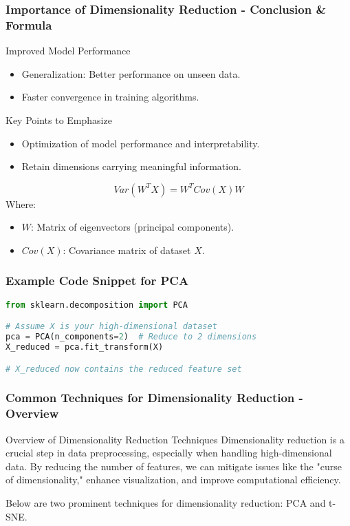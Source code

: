\documentclass[aspectratio=169]{beamer}
\begin{document}
\begin{frame}[fragile]
    \frametitle{Importance of Dimensionality Reduction - Conclusion & Formula}
    \begin{block}{Improved Model Performance}
        \begin{itemize}
            \item Generalization: Better performance on unseen data.
            \item Faster convergence in training algorithms.
        \end{itemize}
    \end{block}

    \begin{block}{Key Points to Emphasize}
        \begin{itemize}
            \item Optimization of model performance and interpretability.
            \item Retain dimensions carrying meaningful information.
        \end{itemize}
    \end{block}

    \begin{equation}
        Var(W^TX) = W^T Cov(X) W
    \end{equation}
    Where:
    \begin{itemize}
        \item \(W\): Matrix of eigenvectors (principal components).
        \item \(Cov(X)\): Covariance matrix of dataset \(X\).
    \end{itemize} 
\end{frame}

\begin{frame}[fragile]
    \frametitle{Example Code Snippet for PCA}
    \begin{lstlisting}[language=Python]
from sklearn.decomposition import PCA

# Assume X is your high-dimensional dataset
pca = PCA(n_components=2)  # Reduce to 2 dimensions
X_reduced = pca.fit_transform(X)

# X_reduced now contains the reduced feature set
    \end{lstlisting}
\end{frame}

\begin{frame}[fragile]
    \frametitle{Common Techniques for Dimensionality Reduction - Overview}
    \begin{block}{Overview of Dimensionality Reduction Techniques}
        Dimensionality reduction is a crucial step in data preprocessing, especially when handling high-dimensional data. By reducing the number of features, we can mitigate issues like the "curse of dimensionality," enhance visualization, and improve computational efficiency.
    \end{block}
    Below are two prominent techniques for dimensionality reduction: PCA and t-SNE.
\end{frame}
\end{document}
